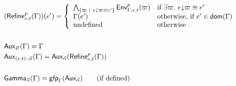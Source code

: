 \documentclass[a4paper]{article}
\theoremstyle{definition}
\begin{document}
    \begin{align*}
      &(\textsf{Refine}^{p}_{e,t}(\Gamma))(e') = 
        \left\{\begin{array}{ll}
          \bigwedge_{\{\varpi ~|~ e{\downarrow}\varpi \equiv e'\}} \textsf{Env}^{p}_{\Gamma,e,t} (\varpi) & \text{if } \exists \varpi.\ e{\downarrow}\varpi \equiv e' \\
          \Gamma(e') & \text{otherwise, if } e' \in \textsf{dom}(\Gamma)\\
          \text{undefined} & \text{otherwise}
        \end{array}\right.\\&\\
      &\textsf{Aux}_{\varnothing}(\Gamma) = \Gamma\\
      &\textsf{Aux}_{{(e,t)}\textsf{::}{\vec \alpha}}(\Gamma) = \textsf{Aux}_{\vec \alpha}(\textsf{Refine}^{p}_{e,t}(\Gamma))\\&\\
      &\textsf{Gamma}_{\vec \alpha}(\Gamma)=\textsf{gfp}_\Gamma (\textsf{Aux}_{\vec \alpha})\qquad \text{(if defined)}
    \end{align*}
\end{document}
